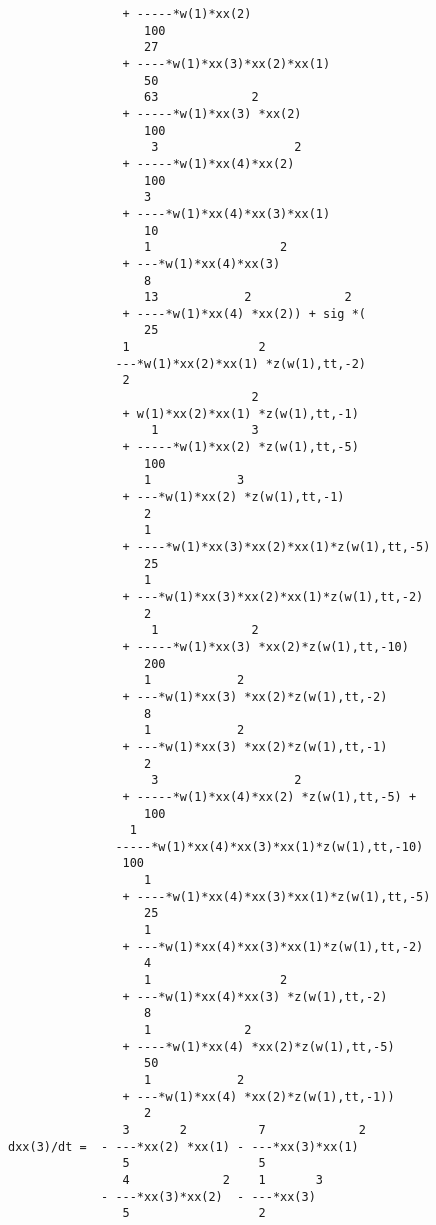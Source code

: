 \documentclass[11pt,a5paper]{article}
\begin{document}
\begin{verbatim}
                + -----*w(1)*xx(2)
                   100
                   27
                + ----*w(1)*xx(3)*xx(2)*xx(1)
                   50
                   63             2
                + -----*w(1)*xx(3) *xx(2)
                   100
                    3                   2
                + -----*w(1)*xx(4)*xx(2)
                   100
                   3
                + ----*w(1)*xx(4)*xx(3)*xx(1)
                   10
                   1                  2
                + ---*w(1)*xx(4)*xx(3)
                   8
                   13            2             2
                + ----*w(1)*xx(4) *xx(2)) + sig *(
                   25
                1                  2
               ---*w(1)*xx(2)*xx(1) *z(w(1),tt,-2)
                2
                                  2
                + w(1)*xx(2)*xx(1) *z(w(1),tt,-1)
                    1             3
                + -----*w(1)*xx(2) *z(w(1),tt,-5)
                   100
                   1            3
                + ---*w(1)*xx(2) *z(w(1),tt,-1)
                   2
                   1
                + ----*w(1)*xx(3)*xx(2)*xx(1)*z(w(1),tt,-5)
                   25
                   1
                + ---*w(1)*xx(3)*xx(2)*xx(1)*z(w(1),tt,-2)
                   2
                    1             2
                + -----*w(1)*xx(3) *xx(2)*z(w(1),tt,-10)
                   200
                   1            2
                + ---*w(1)*xx(3) *xx(2)*z(w(1),tt,-2)
                   8
                   1            2
                + ---*w(1)*xx(3) *xx(2)*z(w(1),tt,-1)
                   2
                    3                   2
                + -----*w(1)*xx(4)*xx(2) *z(w(1),tt,-5) + 
                   100
                 1
               -----*w(1)*xx(4)*xx(3)*xx(1)*z(w(1),tt,-10)
                100
                   1
                + ----*w(1)*xx(4)*xx(3)*xx(1)*z(w(1),tt,-5)
                   25
                   1
                + ---*w(1)*xx(4)*xx(3)*xx(1)*z(w(1),tt,-2)
                   4
                   1                  2
                + ---*w(1)*xx(4)*xx(3) *z(w(1),tt,-2)
                   8
                   1             2
                + ----*w(1)*xx(4) *xx(2)*z(w(1),tt,-5)
                   50
                   1            2
                + ---*w(1)*xx(4) *xx(2)*z(w(1),tt,-1))
                   2
                3       2          7             2
dxx(3)/dt =  - ---*xx(2) *xx(1) - ---*xx(3)*xx(1)
                5                  5
                4             2    1       3
             - ---*xx(3)*xx(2)  - ---*xx(3)
                5                  2

\end{verbatim}
\end{document}
